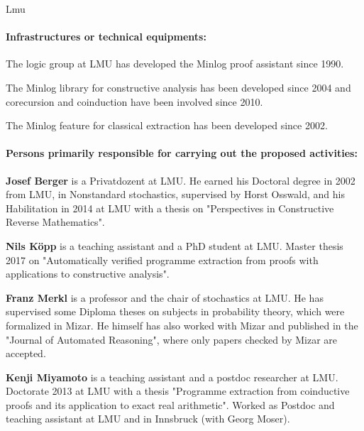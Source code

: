 \begin{sitedescription}{Lmu}
\paragraph*{Infrastructures or technical equipments:}

\begin{compactitem}
\item The logic group at LMU has developed the Minlog proof assistant since 1990.
\item The Minlog library for constructive analysis has been developed since 2004
and corecursion and coinduction have been involved since 2010.
\item The Minlog feature for classical extraction has been developed since 2002.
\end{compactitem}

\paragraph*{Persons primarily responsible for carrying out the proposed activities:}

\begin{compactitem}

\item \textbf{Josef Berger} is a Privatdozent at LMU.  He earned his
  Doctoral degree in 2002 from LMU, in Nonstandard stochastics,
  supervised by Horst Osswald, and his Habilitation in 2014 at LMU
  with a thesis on "Perspectives in Constructive Reverse Mathematics".

\item \textbf{Nils K\"opp} is a teaching assistant and a PhD student
  at LMU.  Master thesis 2017 on "Automatically verified programme
  extraction from proofs with applications to constructive analysis".

\item \textbf{Franz Merkl} is a professor and the chair of stochastics
  at LMU.  He has supervised some Diploma theses on subjects in
  probability theory, which were formalized in Mizar.  He himself has
  also worked with Mizar and published in the "Journal of Automated
  Reasoning", where only papers checked by Mizar are accepted.

\item \textbf{Kenji Miyamoto} is a teaching assistant and a postdoc
  researcher at LMU.  Doctorate 2013 at LMU with a thesis "Programme
  extraction from coinductive proofs and its application to exact real
  arithmetic".  Worked as Postdoc and teaching assistant at LMU and in
  Innsbruck (with Georg Moser).


\end{compactitem}
\end{sitedescription}
